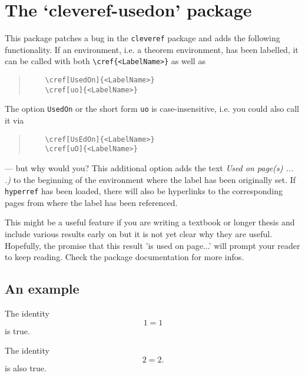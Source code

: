 
\section{The `cleveref-usedon' package}
\label{sec:TestSection}

This package patches a bug in the \verb|cleveref| package and adds the following functionality. If an environment, i.e. a theorem environment, has been labelled, it can be called with both \verb|\cref{<LabelName>}| as well as
\begin{quote}
\begin{verbatim}
	\cref[UsedOn]{<LabelName>}
	\cref[uo]{<LabelName>}
\end{verbatim}
\end{quote}
The option \verb|UsedOn| or the short form \verb|uo| is case-insensitive, i.e. you could also call it via
\begin{quote}
\begin{verbatim}
	\cref[UsEdOn]{<LabelName>}
	\cref[uO]{<LabelName>}
\end{verbatim}
\end{quote}
--- but why would you?
This additional option adds the text \emph{Used on page(s) ... .)} to the beginning of the environment where the label has been originally set. If \verb|hyperref| has been loaded, there will also be hyperlinks to the corresponding pages from where the label has been referenced.

This might be a useful feature if you are writing a textbook or longer thesis and include various results early on but it is not yet clear why they are useful. 
Hopefully, the promise that this result 'is used on page...' will prompt your reader to keep reading.
Check the package documentation for more infos.

\subsection{An example}

\begin{theorem}
\label{thm:TestTheorem}
The identity
\begin{equation*}
	1=1
\end{equation*}
is true.
\end{theorem}

\begin{lemma}
\label{lemma:TestLemma}
The identity
\begin{equation*}
	2=2.
\end{equation*}
is also true.
\end{lemma}

